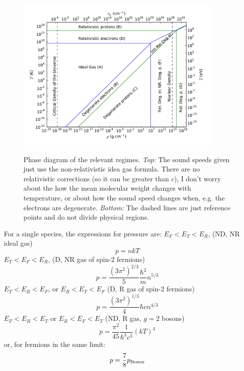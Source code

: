 \documentclass{emulateapj}
\begin{document}
\begin{figure}
  \centering
  \includegraphics[width=0.9\textwidth]{f3.pdf}\\
  \caption{Phase diagram of the relevant regimes.  {\it Top:} The
    sound speeds given just use the non-relativistic idea gas formula.
    There are no relativistic corrections (so it can be greater than
    $c$), I don't worry about the how the mean molecular weight
    changes with temperature, or about how the sound speed changes
    when, e.g. the electrons are degenerate. {\it Bottom:} The dashed
    lines are just reference points and do not divide physical
    regions.}
  \label{fig:eos-regimes}
\end{figure}


For a single species, the expressions for pressure are:
$E_F < E_T < E_R$, (ND, NR ideal gas)
\begin{equation}
  p = n k T
\end{equation}
$E_T < E_F < E_R$, (D, NR gas of spin-2 fermions)
\begin{equation}
  p = \frac{(3 \pi^2)^{2/3}}{5} \frac{\hbar^2}{m} n^{5/3}
\end{equation}
$E_T < E_R < E_F$, or $E_R < E_T < E_F$ (D, R gas of spin-2 fermions)
\begin{equation}
  p = \frac{(3\pi^2)^{1/3}}{4} \hbar c n^{4/3}
\end{equation}
$E_F < E_R < E_T$ or $E_R < E_F < E_T$ (ND, R gas, $g=2$ bosons)
\begin{equation}
  p = \frac{\pi^2}{45} \frac{1}{\hbar^3 c^3} (kT)^4
\end{equation}
or, for fermions in the same limit:
\begin{equation}
  p = \frac{7}{8} p_{\rm Boson}
\end{equation}
\end{document}
